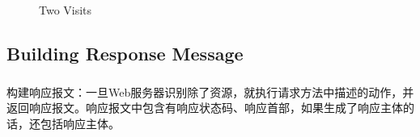 \documentclass{article}
\begin{document}
	\begin{figure}[htbp]
	\centering    %
		
	 
	\caption{Two Visits} %
	\label{fig:1}  %
	\end{figure}

	\clearpage

	\subsection{Building Response Message}
	\begin{CJK}{UTF8}{gbsn}
		\subparagraph{}
		构建响应报文：一旦Web服务器识别除了资源，就执行请求方法中描述的动作，并返回响应报文。响应报文中包含有响应状态码、响应首部，如果生成了响应主体的话，还包括响应主体。
	\end{CJK}{}
\end{document}

